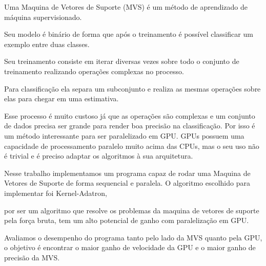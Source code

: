 Uma Maquina de Vetores de Suporte (MVS) é um método de aprendizado de máquina supervisionado. %

Seu modelo é binário de forma que após o treinamento é possível classificar um exemplo entre duas classes.

Seu treinamento consiste em iterar diversas vezes sobre todo o conjunto de treinamento realizando operações complexas no processo. 

Para classificação ela separa um subconjunto e realiza as mesmas operações sobre elas para chegar em uma estimativa. 

Esse processo é muito custoso já que as operações são complexas e um conjunto de dados precisa ser grande para render boa precisão na classificação. 
Por isso é um método interessante para ser paralelizado em GPU. GPUs possuem uma capacidade de processamento paralelo muito acima das CPUs, mas o seu uso não é trivial e é preciso adaptar os algoritmos à sua arquitetura. 

Nesse trabalho implementamos um programa capaz de rodar uma Maquina de Vetores de Suporte de forma sequencial e paralela. O algoritmo escolhido para implementar foi Kernel-Adatron, 

por ser um algoritmo que resolve os problemas da maquina de vetores de suporte pela força bruta, tem um alto potencial de ganho com paralelização em GPU. 

Avaliamos o desempenho do programa tanto pelo lado da MVS quanto pela GPU, o objetivo é encontrar o maior ganho de velocidade da GPU e o maior ganho de precisão da MVS.
